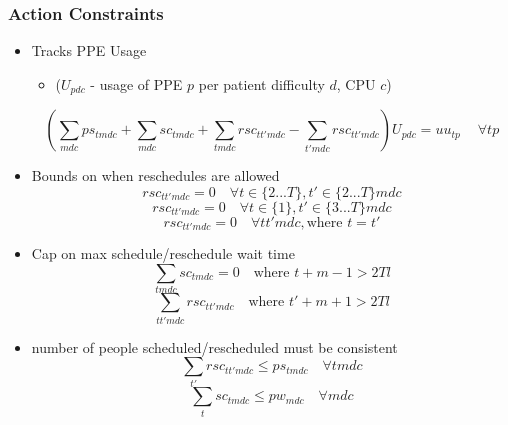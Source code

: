 \documentclass{article}
\begin{document}
\subsubsection{Action Constraints}
\label{action constraints}
\begin{itemize}
    \item Tracks PPE Usage  
    \begin{itemize}
    		\item ($U_{pdc}$ - usage of PPE $p$ per patient difficulty $d$, CPU $c$)
    \end{itemize}
        \begin{equation} 
			(\sum_{mdc}ps_{tmdc} + \sum_{mdc}sc_{tmdc} + 
			\sum_{tmdc} rsc_{tt'mdc} - \sum_{t'mdc} rsc_{tt'mdc})U_{pdc} = uu_{tp}\ \quad \forall tp
		\end{equation}
	
	\item Bounds on when reschedules are allowed
		\begin{equation}  
			rsc_{tt'mdc} = 0 \quad \forall t \in \{ 2...T \}, t' \in \{2...T\} mdc 
		\end{equation} 
		\begin{equation}  
			rsc_{tt'mdc} = 0 \quad \forall t \in \{ 1 \}, t'\in \{ 3...T \} mdc 
		\end{equation} 
		\begin{equation}  
			rsc_{tt'mdc} = 0 \quad \forall tt'mdc, \text{where } t=t' 
		\end{equation} 

	\item Cap on max schedule/reschedule wait time
		\begin{equation}  
			\sum_{tmdc} sc_{tmdc} = 0 \quad \text{where } t+m-1 > 2Tl 
		\end{equation} 
		\begin{equation}  
			\sum_{tt'mdc} rsc_{tt'mdc} \quad \text{where } t'+m+1 > 2Tl 
		\end{equation} 

	\item number of people scheduled/rescheduled must be consistent
		\begin{equation}  
			\sum_{t'} rsc_{tt'mdc} \le ps_{tmdc} \quad \forall tmdc 
		\end{equation} 
		\begin{equation}  
			\sum_{t} sc_{tmdc} \le pw_{mdc} \quad \forall mdc 
		\end{equation} 
\end{itemize}
\end{document}
